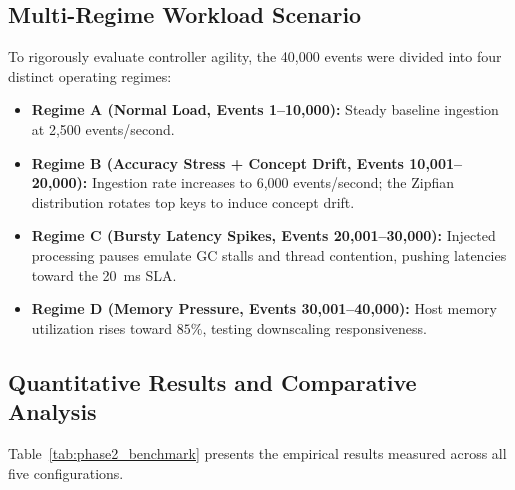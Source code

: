 \subsection{Multi-Regime Workload Scenario}
To rigorously evaluate controller agility, the 40,000 events were divided into four distinct operating regimes:
\begin{itemize}
    \item \textbf{Regime A (Normal Load, Events 1--10,000):} Steady baseline ingestion at 2,500 events/second.
    \item \textbf{Regime B (Accuracy Stress + Concept Drift, Events 10,001--20,000):} Ingestion rate increases to 6,000 events/second; the Zipfian distribution rotates top keys to induce concept drift.
    \item \textbf{Regime C (Bursty Latency Spikes, Events 20,001--30,000):} Injected processing pauses emulate GC stalls and thread contention, pushing latencies toward the 20~ms SLA.
    \item \textbf{Regime D (Memory Pressure, Events 30,001--40,000):} Host memory utilization rises toward $85\%$, testing downscaling responsiveness.
\end{itemize}

\subsection{Quantitative Results and Comparative Analysis}
Table~\ref{tab:phase2_benchmark} presents the empirical results measured across all five configurations.

\begin{table}[htbp]
\centering
{}
\caption{Comprehensive performance comparison across 40,000 Zipfian events under multi-regime traffic bursts, memory pressure, and concept drift.}
\label{tab:phase2_benchmark}
\end{table}

